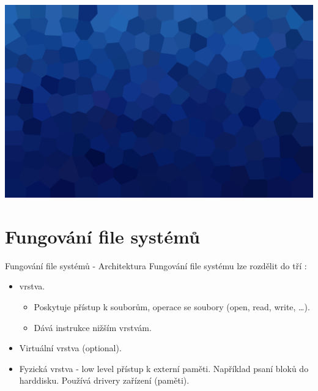 \documentclass[aspectratio=169,xcolor=dvipsnames, t]{beamer}
\begin{document}
{
{
    \includegraphics[width=\paperwidth,height=\paperheight]{AICStyleData/logos/mene_polygonu_bg.png}
}
\section{Fungování file systémů}
\begin{frame}{Fungování file systémů - Architektura}
Fungování file systému lze rozdělit do tří :
\begin{itemize}
    \item {} vrstva.
    \begin{itemize}
        \item Poskytuje přístup k souborům, operace se soubory (open, read, write, \dots).
        \item Dává instrukce nižším vrstvám.
    \end{itemize}
    \item Virtuální vrstva (optional).
    \item Fyzická vrstva - low level přístup k externí paměti. Například psaní bloků do harddisku. Používá drivery zařízení (paměti).
\end{itemize}
\end{frame}
}
\end{document}
